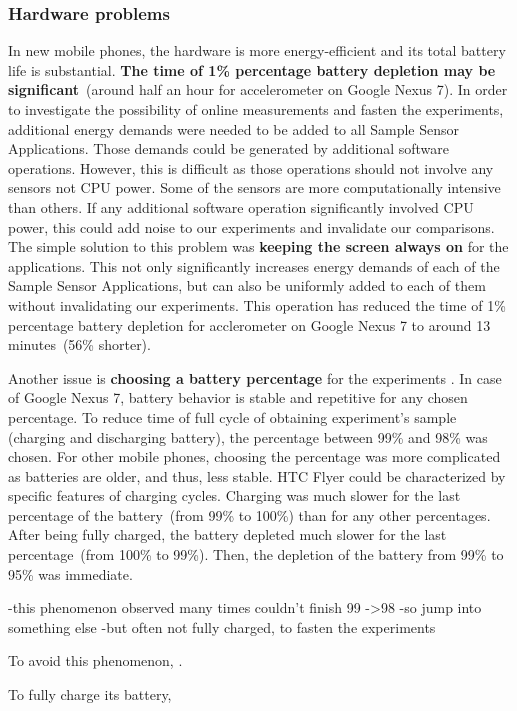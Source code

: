 \subsubsection{Hardware problems}
In new mobile phones, the hardware is more energy-efficient and its total battery life is substantial. \textbf{The time of 1\% percentage battery depletion may be significant}\ (around half an hour for accelerometer on Google Nexus 7). In order to investigate the possibility of online measurements and fasten the experiments, additional energy demands were needed to be added to all Sample Sensor Applications. Those demands could be generated by additional software operations. However, this is difficult as those operations should not involve any sensors not CPU power. Some of the sensors are more computationally intensive than others. If any additional software operation significantly involved CPU power, this could add noise to our experiments and invalidate our comparisons. The simple solution to this problem was \textbf{keeping the screen always on} for the applications.  This not only significantly increases energy demands of each of the Sample Sensor Applications, but can also be uniformly added to each of them without invalidating our experiments.  This operation has reduced the time of 1\% percentage battery depletion for acclerometer on Google Nexus 7 to around 13 minutes\ (56\% shorter).  

Another issue is \textbf{choosing a battery percentage} for the experiments . In case of Google Nexus 7, battery behavior is stable and repetitive for any chosen percentage. To reduce time of full cycle of obtaining experiment's sample (charging and discharging battery),  the percentage between 99\% and 98\% was chosen. For other mobile phones, choosing the percentage was more complicated as batteries are older, and thus, less stable. HTC Flyer could be characterized by specific features of charging cycles. Charging was much slower for the last percentage of the battery\ (from 99\% to 100\%) than for any other percentages. After being fully charged, the battery depleted much slower for the last percentage\ (from 100\% to 99\%). Then, the depletion of the battery from 99\% to 95\% was immediate.  

-this phenomenon observed many times
	couldn't finish 99 ->98
	-so jump into something else
		-but often not fully charged, to fasten the experiments 

To avoid this phenomenon, .

To fully charge its battery, 


